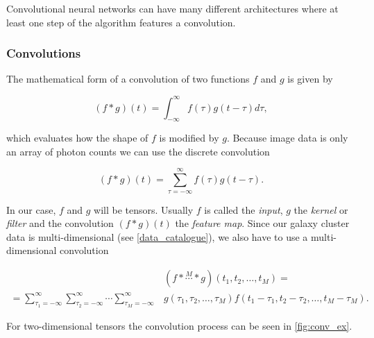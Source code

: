 Convolutional neural networks can have many different architectures where at least one step of the algorithm features a convolution. 
\subsubsection*{Convolutions}

The mathematical form of a convolution of two functions $f$ and $g$ is given by

\begin{equation}
    (f \ast g)(t) = \int_{-\infty}^{\infty}f(\tau)g(t-\tau)d\tau, 
\end{equation}

which evaluates how the shape of $f$ is modified by $g$. Because image data is only an array of photon counts we can use the discrete convolution

\begin{equation}
    (f \ast g)(t) = \sum_{\tau=-\infty}^{\infty}f(\tau)g(t-\tau).
\end{equation}

In our case, $f$ and $g$ will be tensors. Usually $f$ is called the \textit{input}, $g$ the \textit{kernel} or \textit{filter} and the convolution $(f \ast g)(t)$ the \textit{feature map}. Since our galaxy cluster data is multi-dimensional (see \cref{data_catalogue}), we also have to use a multi-dimensional convolution


\begin{equation}
\begin{split}
    &(f \ast \overset{M}{\cdots} \ast g)(t_1,t_2,\dotsc,t_M) = \\ 
    = \sum_{\tau_1 = - \infty}^{\infty} \sum_{\tau_2 = - \infty}^{\infty} \cdots \sum_{\tau_M = - \infty}^{\infty} &g(\tau_1,\tau_2,\dotsc,\tau_M) f(t_1 - \tau_1, t_2 - \tau_2, \dotsc, t_M-\tau_M).
\end{split}
\end{equation}

For two-dimensional tensors the convolution process can be seen in \autoref{fig:conv_ex}.

